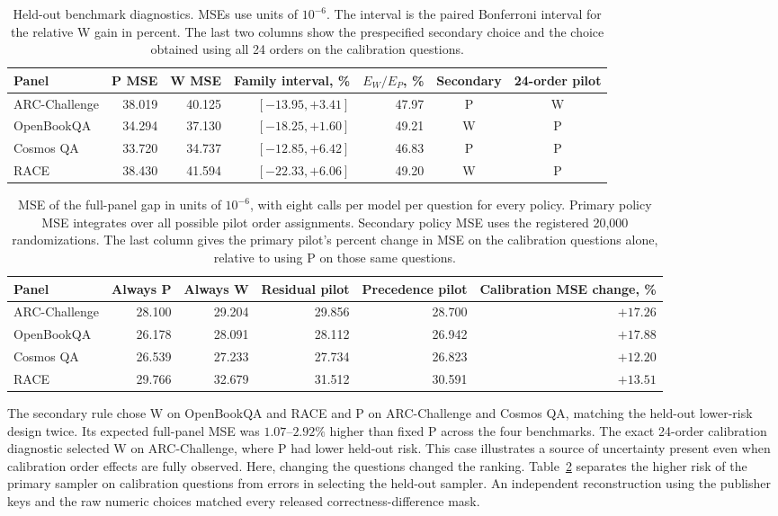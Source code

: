 \begin{table}[h]
\centering
\small
\caption{Held-out benchmark diagnostics. MSEs use units of $10^{-6}$. The interval is the paired
Bonferroni interval for the relative W gain in percent. The last two columns show the prespecified
secondary choice and the choice obtained using all 24 orders on the calibration questions.}
\label{tab:pilot-holdout}
\begin{tabular}{@{}lrrrrcc@{}}
\toprule
Panel & P MSE & W MSE & Family interval, \% & $E_W/E_P$, \% & Secondary & 24-order pilot \\
\midrule
ARC-Challenge & 38.019 & 40.125 & $[-13.95,+3.41]$ & 47.97 & P & W \\
OpenBookQA & 34.294 & 37.130 & $[-18.25,+1.60]$ & 49.21 & W & P \\
Cosmos QA & 33.720 & 34.737 & $[-12.85,+6.42]$ & 46.83 & P & P \\
RACE & 38.430 & 41.594 & $[-22.33,+6.06]$ & 49.20 & W & P \\
\bottomrule
\end{tabular}
\end{table}

\begin{table}[h]
\centering
\small
\caption{MSE of the full-panel gap in units of $10^{-6}$, with eight calls per model per question for every policy.
Primary policy MSE integrates over all possible pilot order assignments. Secondary policy MSE uses the registered
20,000 randomizations. The last column gives the primary pilot's percent change in MSE on the calibration questions
alone, relative to using P on those same questions.}
\label{tab:pilot-charged}
\begin{tabular}{@{}lrrrrr@{}}
\toprule
Panel & Always P & Always W & Residual pilot & Precedence pilot & Calibration MSE change, \% \\
\midrule
ARC-Challenge & 28.100 & 29.204 & 29.856 & 28.700 & $+17.26$ \\
OpenBookQA & 26.178 & 28.091 & 28.112 & 26.942 & $+17.88$ \\
Cosmos QA & 26.539 & 27.233 & 27.734 & 26.823 & $+12.20$ \\
RACE & 29.766 & 32.679 & 31.512 & 30.591 & $+13.51$ \\
\bottomrule
\end{tabular}
\end{table}

The secondary rule chose W on OpenBookQA and RACE and P on ARC-Challenge
and Cosmos QA, matching the held-out lower-risk design twice. Its
expected full-panel MSE was $1.07$--$2.92\%$ higher than fixed P
across the four benchmarks. The exact 24-order calibration diagnostic
selected W on ARC-Challenge, where P had lower held-out risk. This
case illustrates a source of uncertainty present even when calibration
order effects are fully observed. Here, changing the questions changed the ranking. Table~\ref{tab:pilot-charged}
separates the higher risk of the primary sampler on calibration
questions from errors in selecting the held-out sampler.
An independent reconstruction using the publisher keys and the raw
numeric choices matched every released correctness-difference mask.
